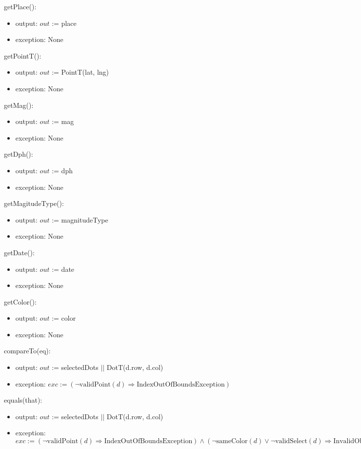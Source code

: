 \documentclass[12pt]{article}
\begin{document}
\noindent getPlace():
\begin{itemize}
\item output: $out$ := place
\item exception: None
\end{itemize}

\noindent getPointT():
\begin{itemize}
\item output: $out$ := PointT(lat, lng)
\item exception: None
\end{itemize}

\noindent getMag():
\begin{itemize}
\item output: $out$ := mag
\item exception: None
\end{itemize}

\noindent getDph():
\begin{itemize}
\item output: $out$ := dph
\item exception: None
\end{itemize}

\noindent getMagitudeType():
\begin{itemize}
\item output: $out$ := magnitudeType
\item exception: None
\end{itemize}

\noindent getDate():
\begin{itemize}
\item output: $out$ := date
\item exception: None
\end{itemize}

\noindent getColor():
\begin{itemize}
\item output: $out$ := color
\item exception: None
\end{itemize}

\noindent compareTo(eq):
\begin{itemize}
\item output: $out$ := selectedDots $||$ DotT(d.row, d.col)
\item exception: $exc := (\neg \mbox{validPoint}(d) \Rightarrow \mbox{IndexOutOfBoundsException})$
\end{itemize}

\noindent equals(that):
\begin{itemize}
\item output: $out$ := selectedDots $||$ DotT(d.row, d.col)
\item exception: $exc := (\neg \mbox{validPoint}(d) \Rightarrow \mbox{IndexOutOfBoundsException})
\wedge (\neg \mbox{sameColor}(d) \vee \neg \mbox{validSelect}(d) \Rightarrow \mbox{InvalidObjectException})$
\end{itemize}
\end{document}

